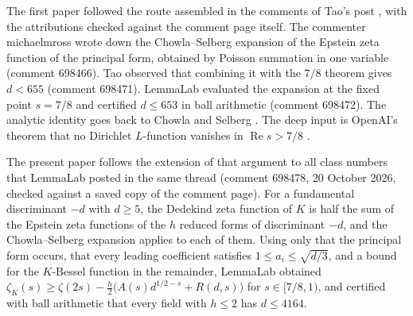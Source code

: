 \documentclass[11pt]{article}
\theoremstyle{definition}
\newcommand{\re}{\operatorname{Re}}
\begin{document}
The first paper followed the route assembled in the comments of Tao's post \cite{Tao2026}, with the attributions checked against the comment page itself. The commenter michaelmross wrote down the Chowla--Selberg expansion of the Epstein zeta function of the principal form, obtained by Poisson summation in one variable (comment 698466). Tao observed that combining it with the $7/8$ theorem gives $d < 655$ (comment 698471). LemmaLab evaluated the expansion at the fixed point $s = 7/8$ and certified $d \le 653$ in ball arithmetic (comment 698472). The analytic identity goes back to Chowla and Selberg \cite{ChowlaSelberg1967}. The deep input is OpenAI's theorem that no Dirichlet $L$-function vanishes in $\re s > 7/8$ \cite{OAImath,OAIqrh}.

The present paper follows the extension of that argument to all class numbers that LemmaLab posted in the same thread (comment 698478, 20 October 2026, checked against a saved copy of the comment page). For a fundamental discriminant $-d$ with $d \ge 5$, the Dedekind zeta function of $K$ is half the sum of the Epstein zeta functions of the $h$ reduced forms of discriminant $-d$, and the Chowla--Selberg expansion applies to each of them. Using only that the principal form occurs, that every leading coefficient satisfies $1 \le a_i \le \sqrt{d/3}$, and a bound for the $K$-Bessel function in the remainder, LemmaLab obtained $\zeta_K(s) \ge \zeta(2s) - \frac h2\bigl(A(s)d^{1/2-s} + R(d,s)\bigr)$ for $s \in [7/8, 1)$, and certified with ball arithmetic that every field with $h \le 2$ has $d \le 4164$.
\end{document}

